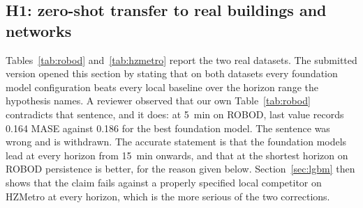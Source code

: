 \documentclass[11pt]{article}
\theoremstyle{plain}
\theoremstyle{definition}
\theoremstyle{remark}
\newif\ifrevisionmarkup
\newcommand{\new}[1]{\ifrevisionmarkup\textcolor{revision}{#1}\else#1\fi}
\begin{document}
\subsection{H1: zero-shot transfer to real buildings and networks}
\label{sec:h1}

Tables~\ref{tab:robod} and~\ref{tab:hzmetro} report the two real datasets. \new{The submitted version opened this section by stating that on both datasets every foundation model configuration beats every local baseline over the horizon range the hypothesis names. A reviewer observed that our own Table~\ref{tab:robod} contradicts that sentence, and it does: at \SI{5}{\minute} on ROBOD, last value records \num{0.164} MASE against \num{0.186} for the best foundation model. The sentence was wrong and is withdrawn. The accurate statement is that the foundation models lead at every horizon from \SI{15}{\minute} onwards, and that at the shortest horizon on ROBOD persistence is better, for the reason given below. Section~\ref{sec:lgbm} then shows that the claim fails against a properly specified local competitor on HZMetro at every horizon, which is the more serious of the two corrections.}
\end{document}
